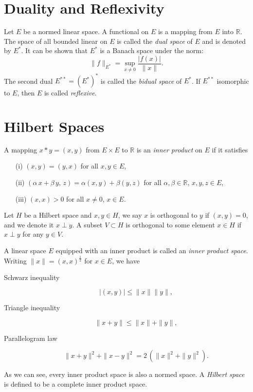 \section{Duality and Reflexivity} Let $E$ be a normed linear space. A functional on $E$ is a mapping from $E$ into $\mathbb{R}$. The space of all bounded linear on $E$ is called the \emph{dual space} of $E$ and is denoted by $E^*$. It can be shown that $E^*$ is a Banach space under the norm:
$$\|f\|_{E^*}=\sup_{x\neq 0}\frac{|f(x)|}{\|x\|}.$$
The second dual $E^{**}=(E^*)^*$ is called the \emph{bidual space} of $E^*$. If $E^{**}$ isomorphic to $E$, then $E$ is called \emph{reflexive}.
\section{Hilbert Spaces} A mapping $x*y=(x,y)$ from $E\times E$ to $\mathbb{R}$ is an \emph{inner product} on $E$ if it satisfies 
\begin{enumerate}
\item[(i)]$(x,y)=(y,x)$ for all $x,y\in E$,
\item[(ii)]$(\alpha\,x+\beta\,y,\,z)=\alpha(x,y)+\beta(y,z)$ for all $\alpha,\beta\in \mathbb{R}$, $x,y,z\in E$,
\item[(iii)]$(x,x)>0$ for all $x\neq 0$, $x\in E$.
\end{enumerate}
\begin{definition} Let $H$ be a Hilbert space and $x,y\in H$, we say $x$ is orthogonal to $y$ if $(x,y)=0$, and we denote it $x\perp y$. A subset $V\subset H$ is orthogonal to some element $x\in H$ if $x\perp y$ for any $y\in V$.
\end{definition}
A linear space $E$ equipped with an inner product is called an \emph{inner product space}. Writing $\|x\|=(x,x)^{\frac{1}{2}}$ for $x\in E$, we have
\begin{description}
\item[Schwarz inequality] 
\begin{equation}
|(x,y)|\leq \|x\|\|y\|,
\end{equation}
\item[Triangle inequality]
\begin{equation}
\|x+y\|\leq \|x\| + \|y\|,
\end{equation}
\item[Parallelogram law]
\begin{equation}
\|x+y\|^2+\|x-y\|^2=2\,(\|x\|^2+\|y\|^2).
\end{equation}
\end{description}
As we can see, every inner product space is also a normed space. A \emph{Hilbert space} is defined to be a complete inner product space.

